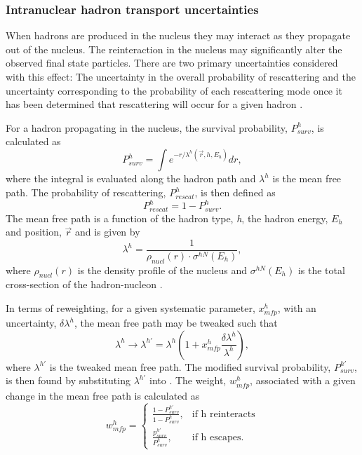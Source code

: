 \subsubsection*{Intranuclear hadron transport uncertainties}
When hadrons are produced in the nucleus they may interact as they propagate out of the nucleus. The reinteraction in the nucleus may significantly alter the observed final state particles. There are two primary uncertainties considered with this effect: The uncertainty in the overall probability of rescattering and the uncertainty corresponding to the probability of each rescattering mode once it has been determined that rescattering will occur for a given hadron \cite{GENIE_manual}. 

For a hadron propagating in the nucleus, the survival probability, $P_{surv}^h$, is calculated as
\begin{equation}
    P_{surv}^h = \int e^{-r/ \lambda^h(\vec r, h, E_h)} dr,
\label{eq:intranuclear_survival_prob}
\end{equation}
where the integral is evaluated along the hadron path and $\lambda^h$ is the mean free path. The probability of rescattering, $P^h_{rescat}$, is then defined as 
\begin{equation}
    P_{rescat}^h = 1 - P_{surv}^h.
\end{equation}
The mean free path is a function of the hadron type, \textit{h}, the hadron energy, $E_h$ and position, $\vec r$ and is given by
\begin{equation}
    \lambda^h = \frac{1}{\rho_{nucl}(r) \cdot \sigma^{hN}(E_h)},
\end{equation}
where $\rho_{nucl}(r)$ is the density profile of the nucleus and $\sigma^{hN}(E_h)$ is the total cross-section of the hadron-nucleon \cite{GENIE_manual}. 

In terms of reweighting, for a given systematic parameter, $x^h_{mfp}$, with an uncertainty, $\delta \lambda^h$, the mean free path may be tweaked such that
\begin{equation}
    \lambda^h \rightarrow \lambda^{h\prime} = \lambda^h \left(1 + x^h_{mfp} \frac{\delta \lambda^h}{\lambda^h} \right),
\end{equation}
where $\lambda^{h\prime}$ is the tweaked mean free path. The modified survival probability, $P_{surv}^{h\prime}$, is then found by substituting $\lambda^{h\prime}$ into . The weight, $w^h_{mfp}$, associated with a given change in the mean free path is calculated as \cite{GENIE_manual}
\begin{equation}
  w^h_{mfp}=\begin{cases}
    \frac{1-P^{h\prime}_{surv}}{1-P^h_{surv}}, & \text{if h reinteracts}\\
    \frac{p^{h\prime}_{surv}}{P^{h}_{surv}}, & \text{if h escapes}.
  \end{cases}
\end{equation}

